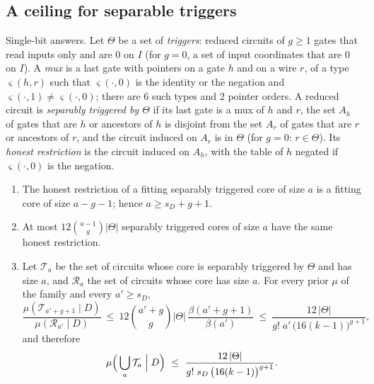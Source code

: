 \subsection{A ceiling for separable triggers}

\begin{theorem}\label{thm:c-ceiling}
Single-bit answers. Let $\Theta$ be a set of \emph{triggers}: reduced circuits of $g\ge1$ gates that read
inputs only and are $0$ on $I$ (for $g=0$, a set of input coordinates that are $0$ on $I$). A \emph{mux} is a
last gate with pointers on a gate $h$ and on a wire $r$, of a type $\varsigma(h,r)$ such that
$\varsigma(\cdot,0)$ is the identity or the negation and $\varsigma(\cdot,1)\ne\varsigma(\cdot,0)$; there are
$6$ such types and $2$ pointer orders. A reduced circuit is \emph{separably triggered by $\Theta$} if its last
gate is a mux of $h$ and $r$, the set $A_h$ of gates that are $h$ or ancestors of $h$ is disjoint from the set
$A_r$ of gates that are $r$ or ancestors of $r$, and the circuit induced on $A_r$ is in $\Theta$ (for $g=0$:
$r\in\Theta$). Its \emph{honest restriction} is the circuit induced on $A_h$, with the table of $h$ negated if
$\varsigma(\cdot,0)$ is the negation.
\begin{enumerate}[label=(\alph*),leftmargin=2em,itemsep=2pt,topsep=2pt]
\item The honest restriction of a fitting separably triggered core of size $a$ is a fitting core of size
$a-g-1$; hence $a\ge s_D+g+1$.
\item At most $12\binom{a-1}{g}|\Theta|$ separably triggered cores of size $a$ have the same honest
restriction.
\item Let $\mathcal T_a$ be the set of circuits whose core is separably triggered by $\Theta$ and has size
$a$, and $\mathcal R_a$ the set of circuits whose core has size $a$. For every prior $\mu$ of the family and
every $a'\ge s_D$,
\[
\frac{\mu(\mathcal T_{a'+g+1}\mid D)}{\mu(\mathcal R_{a'}\mid D)}
\ \le\ 12\binom{a'+g}{g}|\Theta|\,\frac{\beta(a'+g+1)}{\beta(a')}
\ \le\ \frac{12\,|\Theta|}{g!\;a'\,\bigl(16(k-1)\bigr)^{g+1}},
\]
and therefore
\[
\mu\Bigl(\,\bigcup_a\mathcal T_a\Bigm|D\Bigr)\ \le\ \frac{12\,|\Theta|}{g!\;s_D\,\bigl(16(k-1)\bigr)^{g+1}}.
\]
\end{enumerate}
\end{theorem}
